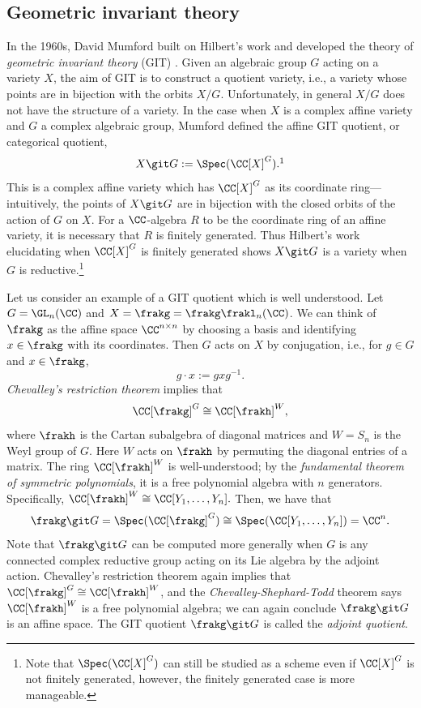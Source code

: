 \documentclass[12pt]{amsart}
\theoremstyle{plain}
\begin{document}
\subsection{Geometric invariant theory}
In the 1960s, David Mumford built on Hilbert's work and developed the theory of \emph{geometric invariant theory} (GIT) \cite{Mumford65}.
Given an algebraic group $G$ acting on a variety $X$, the aim of GIT is to construct a quotient variety, i.e., a variety whose points are in bijection with the orbits $X/G$.
Unfortunately, in general $X/G$ does not have the structure of a variety.
In the case when $X$ is a complex affine variety and $G$ a complex algebraic group, Mumford defined the affine GIT quotient, or categorical quotient,
$$X \git G := \Spec(\CC[X]^G).\footnote{In this work, $\Spec$ denotes the maximal spectrum instead of the prime spectrum, i.e., we consider affine varieties instead of affine schemes. See \S \ref{varietiessection} for further discussion of our definition of a variety.}$$
This is a complex affine variety which has $\CC[X]^G$ as its coordinate ring---intuitively, the points of $X \git G$ are in bijection with the closed orbits of the action of $G$ on $X$.
For a $\CC$-algebra $R$ to be the coordinate ring of an affine variety, it is necessary that $R$ is finitely generated.
Thus Hilbert's work elucidating when $\CC[X]^G$ is finitely generated shows $X \git G$ is a variety when $G$ is reductive.\footnote{Note that $\Spec(\CC[X]^G)$ can still be studied as a scheme even if $\CC[X]^G$ is not finitely generated, however, the finitely generated case is more manageable.}

Let us consider an example of a GIT quotient which is well understood.
Let $G = \GL_n(\CC)$ and $X = \frakg = \frakg\frakl_n(\CC)$.
We can think of $\frakg$ as the affine space $\CC^{n\times n}$ by choosing a basis and identifying $x \in \frakg$ with its coordinates.
Then $G$ acts on $X$ by conjugation, i.e., for $g \in G$ and $x \in \frakg$,
$$g \cdot x := g x g^{-1}.$$
\emph{Chevalley's restriction theorem} \cite[\S 23]{Humphreys72} implies that 
$$\CC[\frakg]^G \cong \CC[\frakh]^W,$$
where $\frakh$ is the Cartan subalgebra of diagonal matrices and $W = S_n$ is the Weyl group of $G$.
Here $W$ acts on $\frakh$ by permuting the diagonal entries of a matrix.
The ring $\CC[\frakh]^W$ is well-understood;
by the \emph{fundamental theorem of symmetric polynomials}, it is a free polynomial algebra with $n$ generators.
Specifically, $\CC[\frakh]^W \cong \CC[Y_1, \ldots, Y_n].$
Then, we have that
$$\frakg \git G = \Spec(\CC[\frakg]^G) \cong \Spec(\CC[Y_1, \ldots, Y_n]) = \CC^n.$$
Note that $\frakg \git G$ can be computed more generally when $G$ is any connected complex reductive group acting on its Lie algebra by the adjoint action.
Chevalley's restriction theorem again implies that $\CC[\frakg]^G \cong \CC[\frakh]^W$, and the \emph{Chevalley-Shephard-Todd} theorem \cite[\S 3]{Humphreys90} says $\CC[\frakh]^W$ is a free polynomial algebra;
we can again conclude $\frakg\git G$ is an affine space.
The GIT quotient $\frakg \git G$ is called the \emph{adjoint quotient}.
\end{document}

